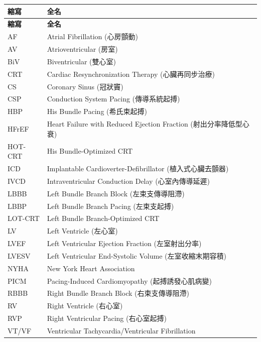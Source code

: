 \documentclass[12pt,a4paper]{article}
\begin{document}
\begin{longtable}{p{4cm}p{10cm}}
\toprule
\textbf{縮寫} & \textbf{全名} \\
\midrule
\endfirsthead
\toprule
\textbf{縮寫} & \textbf{全名} \\
\midrule
\endhead
\bottomrule
\endfoot

AF & Atrial Fibrillation (心房顫動) \\
AV & Atrioventricular (房室) \\
BiV & Biventricular (雙心室) \\
CRT & Cardiac Resynchronization Therapy (心臟再同步治療) \\
CS & Coronary Sinus (冠狀竇) \\
CSP & Conduction System Pacing (傳導系統起搏) \\
HBP & His Bundle Pacing (希氏束起搏) \\
HFrEF & Heart Failure with Reduced Ejection Fraction (射出分率降低型心衰) \\
HOT-CRT & His Bundle-Optimized CRT \\
ICD & Implantable Cardioverter-Defibrillator (植入式心臟去顫器) \\
IVCD & Intraventricular Conduction Delay (心室內傳導延遲) \\
LBBB & Left Bundle Branch Block (左束支傳導阻滯) \\
LBBP & Left Bundle Branch Pacing (左束支起搏) \\
LOT-CRT & Left Bundle Branch-Optimized CRT \\
LV & Left Ventricle (左心室) \\
LVEF & Left Ventricular Ejection Fraction (左室射出分率) \\
LVESV & Left Ventricular End-Systolic Volume (左室收縮末期容積) \\
NYHA & New York Heart Association \\
PICM & Pacing-Induced Cardiomyopathy (起搏誘發心肌病變) \\
RBBB & Right Bundle Branch Block (右束支傳導阻滯) \\
RV & Right Ventricle (右心室) \\
RVP & Right Ventricular Pacing (右心室起搏) \\
VT/VF & Ventricular Tachycardia/Ventricular Fibrillation \\
\bottomrule
\end{longtable}
\end{document}
